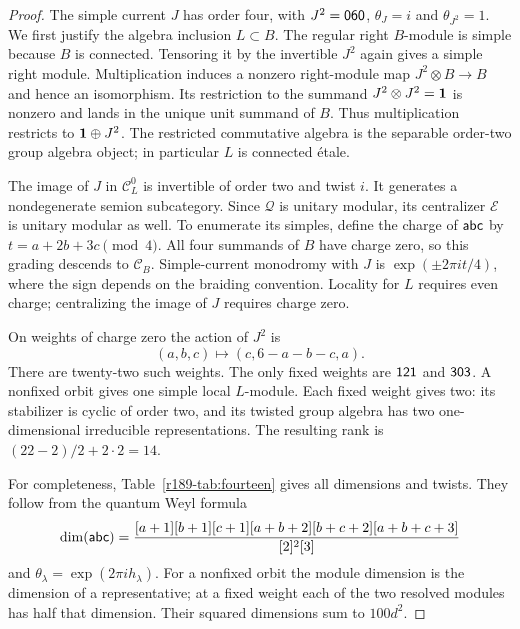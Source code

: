 \begin{proof}
The simple current $J$ has order four, with $J^2=\mathsf{060}$,
$\theta_J=i$ and $\theta_{J^2}=1$. We first justify the algebra
inclusion $L\subset B$. The regular right $B$-module is simple because
$B$ is connected. Tensoring it by the invertible $J^2$ again gives a
simple right module. Multiplication induces a nonzero right-module map
$J^2\otimes B\to B$ and hence an isomorphism. Its restriction to the
summand $J^2\otimes J^2=\mathbf1$ is nonzero and lands in the unique unit
summand of $B$. Thus multiplication restricts to $\mathbf1\oplus J^2$.
The restricted commutative algebra is the separable order-two group
algebra object; in particular $L$ is connected \'etale.

The image of $J$ in $\mathcal{C}_L^0$ is invertible of order two and twist $i$.
It generates a nondegenerate semion subcategory. Since $\mathcal{Q}$ is unitary
modular, its centralizer $\mathcal{E}$ is unitary modular as well.
To enumerate its simples, define the charge of $\mathsf{abc}$ by
$t=a+2b+3c\pmod4$. All four summands of $B$ have charge zero, so this
grading descends to $\mathcal{C}_B$. Simple-current monodromy with $J$ is
$\exp(\pm2\pi i t/4)$, where the sign depends on the braiding
convention. Locality for $L$ requires even charge; centralizing the
image of $J$ requires charge zero.

On weights of charge zero the action of $J^2$ is
\[
 (a,b,c)\longmapsto(c,6-a-b-c,a).
\]
There are twenty-two such weights. The only fixed weights are
$\mathsf{121}$ and $\mathsf{303}$. A nonfixed orbit gives one simple local
$L$-module. Each fixed weight gives two: its stabilizer is cyclic of
order two, and its twisted group algebra has two one-dimensional
irreducible representations. The resulting rank is
$(22-2)/2+2\cdot2=14$.

For completeness, Table~\ref{r189-tab:fourteen} gives all dimensions and
twists. They follow from the quantum Weyl formula
\[
 \dim(\mathsf{abc})=
 \frac{[a+1][b+1][c+1][a+b+2][b+c+2][a+b+c+3]}{[2]^2[3]}
\]
and $\theta_\lambda=\exp(2\pi i h_\lambda)$. For a nonfixed orbit the
module dimension is the dimension of a representative; at a fixed
weight each of the two resolved modules has half that dimension.
Their squared dimensions sum to $100d^2$.


\end{proof}
